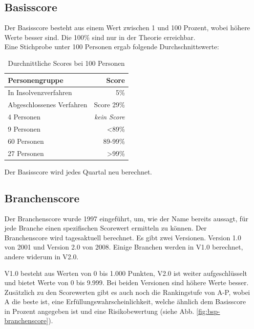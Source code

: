 \documentclass[12pt]{article}
\begin{document}
\subsection{Basisscore}
Der Basisscore besteht aus einem Wert zwischen 1 und 100 Prozent, wobei höhere Werte besser sind. Die 100\% sind nur in der Theorie erreichbar.\\
Eine Stichprobe unter 100 Personen ergab folgende Durchschnittswerte:

\begin{table}[h!]
	\begin{center}
	\begin{tabular}[c]{lr} \hline
		\textbf{Personengruppe} & \textbf{Score}\\
		\hline
		In Insolvenzverfahren & 5\%\\
		Abgeschlossenes Verfahren & Score 29\%\\
		4 Personen & \textit{kein Score}\\
		9 Personen & <89\%\\
		60 Personen & 89-99\%\\
		27 Personen & >99\%\\
		\hline
	\end{tabular}
	\caption{Durchnittliche Scores bei 100 Personen}
	\end{center}
\end{table}

Der Basisscore wird jedes Quartal neu berechnet.



\subsection{Branchenscore}
\label{subsec:branchenscore}
Der Branchenscore wurde 1997 eingeführt, um, wie der Name bereits aussagt, für jede Branche einen spezifischen Scorewert ermitteln zu können. Der Branchenscore wird tagesaktuell berechnet.
Es gibt zwei Versionen. Version 1.0 von 2001 und Version 2.0 von 2008. Einige Branchen werden in V1.0 berechnet, andere widerum in V2.0.

V1.0 besteht aus Werten von 0 bis 1.000 Punkten, V2.0 ist weiter aufgeschlüsselt und bietet Werte von 0 bis 9.999. Bei beiden Versionen sind höhere Werte besser.\\

Zusätzlich zu den Scorewerten gibt es auch noch die Rankingstufe von A-P, wobei A die beste ist, eine Erfüllungswahrscheinlichkeit, welche ähnlich dem Basisscore in Prozent angegeben ist 
und eine Risikobewertung (siehe Abb. \ref{fig:bsp-branchenscore}).
\end{document}
